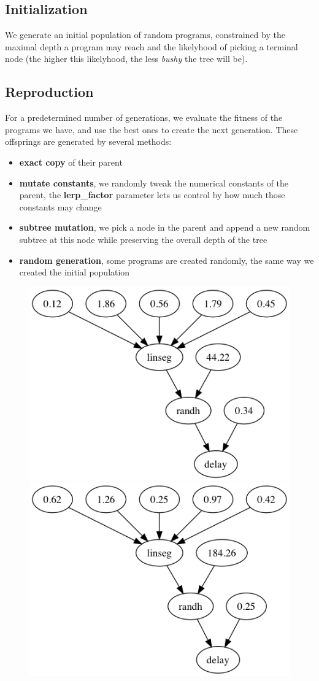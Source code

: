 \documentclass{article}
\begin{document}
\subsection{Initialization}

We generate an initial population of random programs, constrained by the maximal depth a program may reach and the likelyhood of picking a terminal node (the higher this likelyhood, the less \textit{bushy} the tree will be).

\subsection{Reproduction}

For a predetermined number of generations, we evaluate the fitness of the programs we have, and use the best ones to create the next generation. These offsprings are generated by several methods:
\begin{itemize}
    \item \textbf{exact copy} of their parent
    \item \textbf{mutate constants}, we randomly tweak the numerical constants of the parent, the \textbf{lerp\_factor} parameter lets us control by how much those constants may change
    \item \textbf{subtree mutation}, we pick a node in the parent and append a new random subtree at this node while preserving the overall depth of the tree
    \item \textbf{random generation}, some programs are created randomly, the same way we created the initial population
\end{itemize}

\begin{figure}[H]
\centering
\begin{minipage}{.5\textwidth}
  \centering
  \includegraphics[width=.4\linewidth]{mut_cst_before.png}
\end{minipage}%
\begin{minipage}{.5\textwidth}
  \centering
  \includegraphics[width=.4\linewidth]{mut_cst_after.png}
\end{minipage}
\end{figure}
\end{document}
